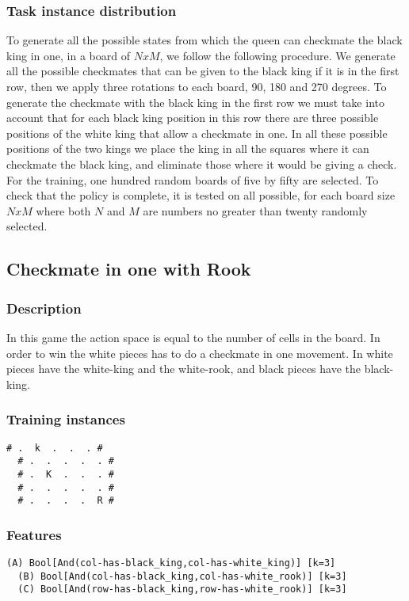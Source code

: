 \documentclass[a4paper]{article}
\begin{document}
\subsubsection{Task instance distribution}
To generate all the possible states from which the queen can checkmate the black king in one, in a board of $NxM$, we follow the following procedure. We generate all the possible checkmates that can be given to the black king if it is in the first row, then we apply three rotations to each board, 90, 180 and 270 degrees. To generate the checkmate with the black king in the first row we must take into account that for each black king position in this row there are three possible positions of the white king that allow a checkmate in one. In all these possible positions of the two kings we place the king in all the squares where it can checkmate the black king, and eliminate those where it would be giving a check. For the training, one hundred random boards of five by fifty are selected. To check that the policy is complete, it is tested on all possible, for each board size $NxM$ where both $N$ and $M$ are numbers no greater than twenty randomly selected.


\subsection{Checkmate in one with Rook}
\subsubsection{Description}
In this game the action space is equal to the number of cells in the board. In order to win the white pieces has to do a checkmate in one movement. In white pieces have the white-king and the white-rook, and black pieces have the black-king.

\subsubsection{Training instances}
\begin{Verbatim}[fontsize=\footnotesize]
  # .  k  .  .  . #
  # .  .  .  .  . #
  # .  K  .  .  . #
  # .  .  .  .  . #
  # .  .  .  .  R #
\end{Verbatim}

\subsubsection{Features}
\begin{Verbatim}[fontsize=\footnotesize]
  (A) Bool[And(col-has-black_king,col-has-white_king)] [k=3]
  (B) Bool[And(col-has-black_king,col-has-white_rook)] [k=3]
  (C) Bool[And(row-has-black_king,row-has-white_rook)] [k=3]
\end{Verbatim}
\end{document}
